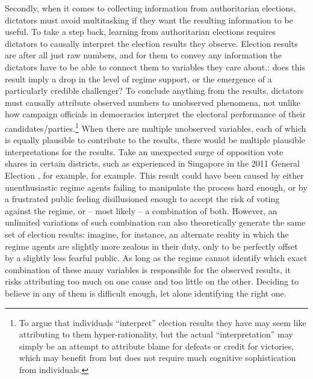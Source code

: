 \documentclass[12pt]{article}
\newcommand{\1}{\mathbbm{1}}
\begin{document}
Secondly, when it comes to collecting information from authoritarian elections, dictators must avoid multitasking if they want the resulting information to be useful. To take a step back, learning from authoritarian elections requires dictators to causally interpret the election results they observe. Election results are after all just raw numbers, and for them to convey any information the dictators have to be able to connect them to variables they care about.: does this result imply a drop in the level of regime support, or the emergence of a particularly credible challenger? To conclude anything from the results, dictators must causally attribute observed numbers to unobserved phenomena, not unlike how campaign officials in democracies interpret the electoral performance of their candidates/parties.\footnote{To argue that individuals ``interpret'' election results they have may seem like attributing to them hyper-rationality, but the actual ``interpretation'' may simply be an attempt to attribute blame for defeats or credit for victories, which may benefit from but does not require much cognitive sophistication from individuals.} When there are multiple unobserved variables, each of which is equally plausible to contribute to the results, there would be multiple plausible interpretations for the results. Take an unexpected surge of opposition vote shares in certain districts, such as experienced in Singapore in the 2011 General Election \citep{TK}, for example, for example. This result could have been caused by either unenthusiastic regime agents failing to manipulate the process hard enough, or by a frustrated public feeling disillusioned enough to accept the risk of voting against the regime, or -- most likely -- a combination of both. However, an unlimited variations of such combination can also theoretically generate the same set of election results: imagine, for instance, an alternate reality in which the regime agents are slightly more zealous in their duty, only to be perfectly offset by a slightly less fearful public. As long as the regime cannot identify which exact combination of these many variables is responsible for the observed results, it risks attributing too much on one cause and too little on the other. Deciding to believe in any of them is difficult enough, let alone identifying the right one. 
\end{document}
